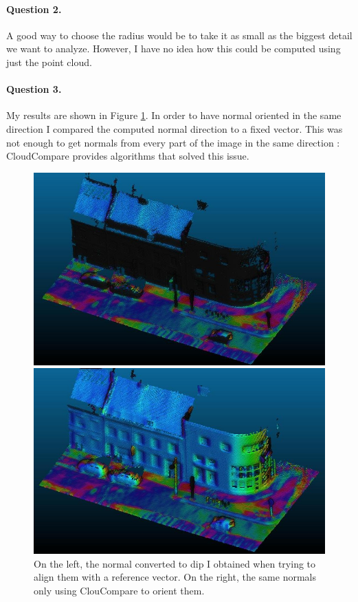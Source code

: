 \documentclass[french]{article}
\begin{document}
\paragraph{Question 2.} A good way to choose the radius would be to take it as small as the biggest detail we want to analyze. However, I have no idea how this could be computed using just the point cloud.

\paragraph{Question 3.} My results are shown in Figure \ref{fig:q3}. In order to have normal oriented in the same direction I compared the computed normal direction to a fixed vector. This was not enough to get normals from every part of the image in the same direction : CloudCompare provides algorithms that solved this issue.

\begin{figure}[h]
	\centering
	\begin{minipage}{0.49\linewidth}
		\includegraphics[width=\linewidth]{q3-raw.jpg}
	\end{minipage}\hfill
	\begin{minipage}{0.49\linewidth}
		\includegraphics[width=\linewidth]{q3-cheat.jpg}
	\end{minipage}
	\caption{On the left, the normal converted to dip I obtained when trying to align them with a reference vector. On the right, the same normals only using ClouCompare to orient them.}
	\label{fig:q3}
\end{figure}
\end{document}
